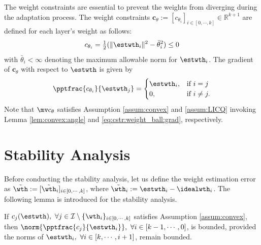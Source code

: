 \documentclass[lettersize,journal]{IEEEtran}
\begin{document}
The weight constraints are essential to prevent the weights from diverging during the adaptation process.
The weight constraints $\boldsymbol{c}_{\theta}:= [c_{\theta_i}]_{i\in[0,\cdots ,k]}\in\mathbb R^{k+1}$ are defined for each layer's weight as follows:
\begin{equation}
    c_{\theta_i}
    =
    \tfrac{1}{2}
    (
        \Vert \estwth_i\Vert^2 
        -
        \bar\theta_i^2 
    )    
    \le 0
    \label{eq:cstr:weight_ball}
\end{equation}
with $\bar\theta_i<\infty$ denoting the maximum allowable norm for $\estwth_i$. 
The gradient of $\boldsymbol{c}_\theta$ with respect to $\estwth$ is given by
\begin{equation}
    \pptfrac{c_{\theta_i}}{\estwth_j} 
    =
    \begin{cases}
        \estwth_i,
        &
        \text{if } i=j
        \\
        0,
        &
        \text{if } i\ne j
        .
    \end{cases} 
    \label{eq:cstr:weight_ball:grad}
\end{equation}
Note that $\mv c_{\theta}$ satisfies Assumption \ref{assum:convex} and \ref{assum:LICQ} invoking Lemma \ref{lem:convex:angle} and \eqref{eq:cstr:weight_ball:grad}, respectively.

\section{Stability Analysis}\label{sec:stability}

Before conducting the stability analysis, let us define the weight estimation error as $\tilde\wth:= [\tilde\wth_i]_{i\in[0,\cdots,k]}$, where $\tilde\wth_i:=\estwth_i-\idealwth_i$.
The following lemma is introduced for the stability analysis.

\begin{lem} 
    If $c_j(\estwth),\ \forall j\in\mathcal I \setminus \{\wth_i\}_{i\in[0,\cdots,k]}$ satisfies Assumption \ref{assum:convex}, then $\norm{\pptfrac{c_j}{\estwth_i}},\ \forall i\in[k-1,\cdots, 0]$, is bounded, provided the norms of $\estwth_i,\ \forall i\in[k,\cdots, i+1]$, remain bounded.
    \label{lem:cstr:grad:bound}
\end{lem}
\end{document}
